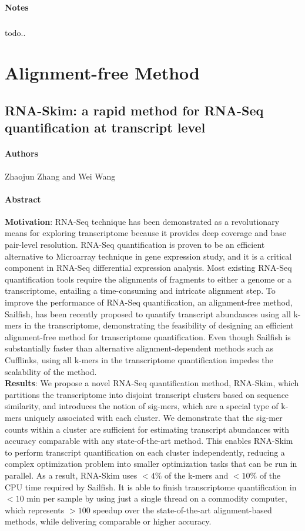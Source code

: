 \documentclass{article}
\begin{document}
		\paragraph{Notes}
		\subparagraph{} todo..
	\section{Alignment-free Method}
		\subsection{RNA-Skim: a rapid method for RNA-Seq quantification at transcript level}
		\paragraph{Authors\\} Zhaojun Zhang and Wei Wang
		\paragraph{Abstract\\} \textbf{Motivation}: RNA-Seq technique has been demonstrated as a revolutionary means for exploring transcriptome because it provides deep coverage and base pair-level resolution. RNA-Seq quantification is proven to be an efficient alternative to Microarray technique in gene expression study, and it is a critical component in RNA-Seq differential expression analysis. Most existing RNA-Seq quantification tools require the alignments of fragments to either a genome or a transcriptome, entailing a time-consuming and intricate alignment step. To improve the performance of RNA-Seq quantification, an alignment-free method, Sailfish, has been recently proposed to quantify transcript abundances using all k-mers in the transcriptome, demonstrating the feasibility of designing an efficient alignment-free method	for transcriptome quantification. Even though Sailfish is substantially	faster than alternative alignment-dependent methods such as Cufflinks, using all k-mers in the transcriptome quantification impedes the scalability of the method.\\	\textbf{Results}: We propose a novel RNA-Seq quantification method, RNA-Skim, which partitions the transcriptome into disjoint transcript clusters based on sequence similarity, and introduces the notion of sig-mers, which are a special type of k-mers uniquely associated with each cluster. We demonstrate that the sig-mer counts within a cluster are sufficient for estimating transcript abundances with accuracy comparable with any state-of-the-art method. This enables RNA-Skim to perform transcript quantification on each cluster independently, reducing a complex optimization problem into smaller optimization tasks that can be run in parallel. As a result, RNA-Skim uses $<4\%$ of the k-mers and $<10\%$ of the CPU time required by Sailfish. It is able to finish transcriptome quantification in $<10$ min per sample by using just a single thread on a commodity computer, which represents $>100$ speedup over the state-of-the-art alignment-based methods, while delivering comparable or higher accuracy.
\end{document}
